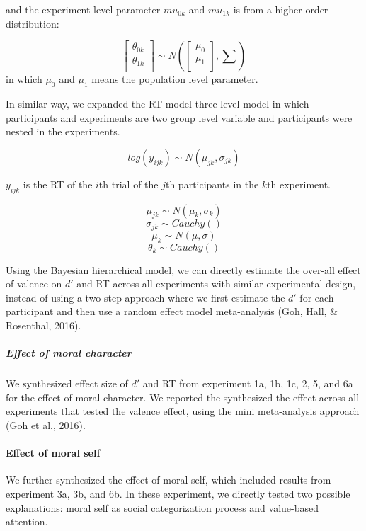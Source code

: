 \documentclass[
  english,
  man]{apa6}
\let\oldparagraph\paragraph
\renewcommand{\paragraph}[1]{\oldparagraph{#1}\mbox{}}
\let\oldsubparagraph\subparagraph
\renewcommand{\subparagraph}[1]{\oldsubparagraph{#1}\mbox{}}
\begin{document}
and the experiment level parameter \(mu_{0k}\) and \(mu_{1k}\) is from a higher order distribution:

\[\begin{bmatrix}\theta_{0k}\\
\theta_{1k}\\
\end{bmatrix} \sim N(\begin{bmatrix}\mu_{0}\\
\mu_{1}\\
\end{bmatrix}, \sum)\]
in which \(\mu_{0}\) and \(\mu_{1}\) means the population level parameter.

In similar way, we expanded the RT model three-level model in which participants and experiments are two group level variable and participants were nested in the experiments.

\[ log(y_{ijk}) \sim N(\mu_{jk}, \sigma_{jk})\]

\(y_{ijk}\) is the RT of the \(i\)th trial of the \(j\)th participants in the \(k\)th experiment.

\[\mu_{jk} \sim N(\mu_{k}, \sigma_{k})\]
\[\sigma_{jk} \sim Cauchy()\]
\[\mu_{k} \sim N(\mu, \sigma)\]
\[\theta_{k} \sim Cauchy()\]

Using the Bayesian hierarchical model, we can directly estimate the over-all effect of valence on \(d'\) and RT across all experiments with similar experimental design, instead of using a two-step approach where we first estimate the \(d'\) for each participant and then use a random effect model meta-analysis (Goh, Hall, \& Rosenthal, 2016).

\hypertarget{effect-of-moral-character}{%
\subparagraph{Effect of moral character}\label{effect-of-moral-character}}

We synthesized effect size of \(d'\) and RT from experiment 1a, 1b, 1c, 2, 5, and 6a for the effect of moral character. We reported the synthesized the effect across all experiments that tested the valence effect, using the mini meta-analysis approach (Goh et al., 2016).

\hypertarget{effect-of-moral-self}{%
\paragraph{Effect of moral self}\label{effect-of-moral-self}}

We further synthesized the effect of moral self, which included results from experiment 3a, 3b, and 6b. In these experiment, we directly tested two possible explanations: moral self as social categorization process and value-based attention.
\end{document}
